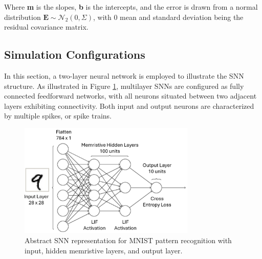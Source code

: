 \noindent Where \textbf{m} is the slopes, \textbf{b} is the intercepts, and the error is drawn from a normal distribution $\textbf{E} \sim \mathcal{N}_2\left( 0, \Sigma \right)$, with 0 mean and standard deviation being the residual covariance matrix.

\subsection[Simulation Configurations]{Simulation Configurations}


In this section, a two-layer neural network is employed to illustrate the SNN structure. As illustrated in Figure \ref{fig:6i}, multilayer SNNs are configured as fully connected feedforward networks, with all neurons situated between two adjacent layers exhibiting connectivity. Both input and output neurons are characterized by multiple spikes, or spike trains.\\
\begin{figure}[htbp!] 
    \centering    
    \includegraphics[width=0.75\textwidth]{Chapter6/Figs/i.png}
    \caption[Abstract SNN representation for MNIST pattern recognition with input, hidden memristive layers, and output layer.]{Abstract SNN representation for MNIST pattern recognition with input, hidden memristive
    layers, and output layer.}
    \label{fig:6i}
\end{figure}

